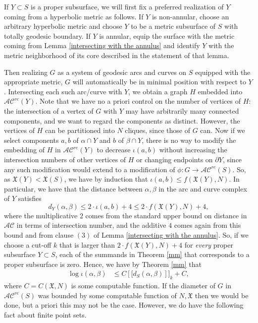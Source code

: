\documentclass[11pt]{amsart}
\theoremstyle{remark}
\numberwithin{equation}{section}
\newcommand{\cAC}{\mathcal{AC}}
\newcommand{\acre}{\cAC^{re}}
\begin{document}

If $Y\subset S$ is a proper subsurface, we will first fix a preferred realization of $Y$ coming from a hyperbolic metric as follows. If $Y$ is non-annular, choose an arbitrary hyperbolic metric and choose $Y$ to be a metric subsurface of $S$ with totally geodesic boundary. If $Y$ is annular, equip the surface with the metric coming from Lemma \ref{intersecting with the annulus} and identify $Y$ with the metric neighborhood of its core described in the statement of that lemma. 

Then realizing $G$ as a system of geodesic arcs and curves on $S$ equipped with the appropriate metric, $G$ will automatically be in minimal position with respect to $Y$. Intersecting each such arc/curve with $Y$, we obtain a graph $H$ embedded into $\acre(Y)$. Note that we have no a priori control on the number of vertices of $H$: the intersection of a vertex of $G$ with $Y$ may have arbitrarily many connected components, and we want to regard the components as distinct. However, the vertices of $H$ can be partitioned into $N$ cliques, since those of $G $ can. Now if we select  components $a,b$ of $\alpha \cap Y$ and $b$ of $\beta \cap Y$, there is no way to modify the embedding of $H$ in $\acre(Y)$ to decrease $\iota(a,b)$ without increasing the intersection numbers of other vertices of $H$ or changing endpoints on $\partial Y$, since any such modification would extend to a modification of $\phi : G \longrightarrow \acre(S)$. So, as $\mathfrak X(Y) < \mathfrak X(S)$, we have by induction that $\iota(a,b) \leq f(\mathfrak X(Y),N)$.  In particular, we have that the distance between $\alpha,\beta$ in the arc and curve complex of $Y$  satisfies
$$d_Y(\alpha,\beta)\leq 2\cdot \iota(a,b)+4 \leq  2 \cdot f(\mathfrak X(Y),N)+4,$$ 
where the multiplicative $2$ comes from the standard upper bound on distance in $\mathcal{AC}$ in terms of intersection number, and the additive $4$ comes again from this bound and from clause $(3)$ of Lemma \ref{intersecting with the annulus}. 
So, if we choose a cut-off $k$ that is larger than  $2 \cdot f(\mathfrak X(Y),N)+4$  for \emph{every}  proper subsurface $Y \subset S$, each of the summands in  Theorem \ref{mm}  that corresponds to a proper subsurface is zero. Hence, we have
by Theorem \ref{mm} that
\begin{align}
\log \iota(\alpha,\beta) &\le C \left[[ d_S ( \alpha,\beta) \right]]_k + C, \label{ibounds}
\end{align}
 where $C=C(\mathfrak X,N)$  is some computable function. %
If the diameter of $G$ in $\acre(S)$ was bounded by some computable function of $N,\mathfrak X$ then we would be done, but a priori this may not be the case.  However,  we do have the following fact about finite point sets.
  
\end{document}
